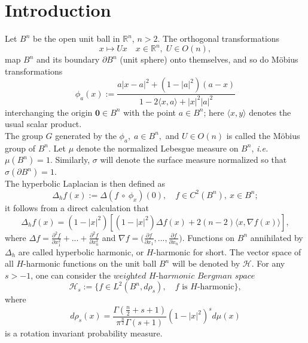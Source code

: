 \documentclass{article}
\theoremstyle{boldremark}
\renewcommand\[{\begin{equation}}
\renewcommand\]{\end{equation}}
\theoremstyle{definition}
\numberwithin{equation}{section}
\begin{document}
\section{Introduction}
Let $B^n$ be the open unit ball in $\mathbb{R}^n$, $n > 2$. The orthogonal transformations
\begin{equation*}
    x \mapsto Ux \quad x \in \mathbb{R}^n,\; U \in O(n),
\end{equation*}
map $B^n$ and its boundary $\partial B^n$ (unit sphere) onto themselves, and so do M{\"o}bius transformations
\begin{equation*}
    \phi_a(x) := \frac{a|x-a|^2 + (1-|a|^2)(a-x)}{1 - 2\langle x, a \rangle + |x|^2|a|^2}
\end{equation*}
interchanging the origin $\textbf{0} \in B^n$ with the point $a \in B^n$; here $\langle x,y\rangle$ denotes the usual scalar product.\\
The group $G$ generated by the $\phi_a,\;a \in B^n,$ and $U \in O(n)$ is called the Möbius group of $B^n$.
Let $\mu$ denote the normalized Lebesgue measure on $B^n$, \emph{i.e.} $\mu(B^n) = 1$. Similarly, $\sigma$ will denote the surface measure normalized so that $\sigma(\partial B^n) = 1.$\\
The hyperbolic Laplacian is then defined as \begin{equation} \label{eq1}
    \Delta_hf(x) := \Delta(f \:\circ \: \phi_x)(0), \quad f\in C^2(B^n), \: x\in B^n;
\end{equation}
it follows from a direct calculation that  \begin{equation*}
    \Delta_h f(x) = (1-|x|^2)[(1- |x|^2)\Delta f(x) + 2(n-2)\langle x,\nabla f(x) \rangle ],
\end{equation*}
where $\Delta f =  \frac{\partial^2 f}{\partial x_1^2} + ...+ \frac{\partial^2 f}{\partial x_n^2}$ and $\nabla f = \big(\frac{\partial f}{\partial x_1} , ...,\frac{\partial f}{\partial x_n}\big)$.
Functions on $B^n$ annihilated by $\Delta_h$ are called hyperbolic harmonic, or $H$-harmonic for short. The vector space of all $H$-harmonic functions on the unit ball $B^n$ will be denoted by $\mathcal{H}$.
For any $s > -1$, one can consider the $\textit{weighted $H$-harmonic Bergman space}$
\begin{equation} \label{Bergman}
    \mathcal{H}_s := \{f \in L^2(B^n, d\rho_s), \quad f \text{ is $H$-harmonic} \},
\end{equation}
where $$d\rho_s(x) = \frac{\Gamma(\frac{n}{2}+s+1)}{\pi^{\frac{n}{2}}\Gamma(s+1)}(1-|x|^2)^sd\mu(x)$$
is a rotation invariant probability measure.
\end{document}
